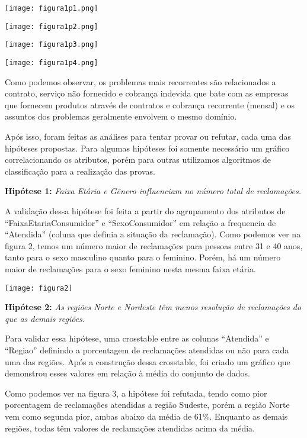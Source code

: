 \documentclass[review]{elsarticle}
\begin{document}
\texttt{[image: figura1p1.png]}


\texttt{[image: figura1p2.png]}

 
\texttt{[image: figura1p3.png]}

 
\texttt{[image: figura1p4.png]}

 \vspace*{5px}
    Como podemos observar, os problemas mais recorrentes são relacionados a contrato, serviço não fornecido e cobrança indevida que bate com as empresas que fornecem produtos através de contratos e cobrança recorrente (mensal) e os assuntos dos problemas geralmente envolvem o mesmo domínio.
    
    Após isso, foram feitas as análises para tentar provar ou refutar, cada uma das hipóteses propostas. Para algumas hipóteses foi somente necessário um gráfico correlacionando os atributos, porém para outras utilizamos algoritmos de classificação para a realização das provas. 

 \vspace*{5px}
 \textbf{Hipótese 1:} \textit{Faixa Etária e Gênero influenciam no número total de reclamações.}
 
 \vspace*{5px}
	A validação dessa hipótese foi feita a partir do agrupamento dos atributos de “FaixaEtariaConsumidor” e “SexoConsumidor” em relação a frequencia de “Atendida” (coluna que definia a situação da reclamação). Como podemos ver na figura 2, temos um número maior de reclamações para pessoas entre 31 e 40 anos, tanto para o sexo masculino quanto para o feminino. Porém, há um número maior de reclamações para o sexo feminino nesta mesma faixa etária.
	
\texttt{[image: figura2]}

\textbf{Hipótese 2:} \textit{As regiões Norte e Nordeste têm menos resolução de reclamações do que as demais regiões.}

\vspace*{5px}
    Para validar essa hipótese, uma crosstable entre as colunas “Atendida” e “Regiao” definindo a porcentagem de reclamações atendidas ou não para cada uma das regiões. Após a construção dessa crosstable, foi criado um gráfico que demonstrou esses valores em relação à média do conjunto de dados. 
    
    Como podemos ver na figura 3, a hipótese foi refutada, tendo como pior porcentagem de reclamações atendidas a região Sudeste, porém a região Norte vem como segunda pior, ambas abaixo da média de 61\%. Enquanto as demais regiões, todas têm valores de reclamações atendidas acima da média. 
\end{document}
